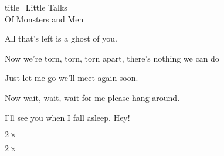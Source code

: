 \begin{song}{title=\predtitle\centering Little Talks \\\large Of Monsters and Men  \vspace*{-0.3cm}}
\begin{centerjustified}
    All that's left is a ghost of you.

 \begin{minipage}{0.87\textwidth}
    Now we're torn, torn, torn apart, there's nothing we can do

    Just let me go we'll meet again soon.

    Now wait, wait, wait for me please hang around.

    I'll see you when I fall asleep. Hey!
\end{minipage}
\begin{minipage}{0.08\textwidth}
\vspace*{0.4cm}
 $2 \times $

 $2 \times $
\end{minipage}




\end{centerjustified}
\setcounter{Slokočet}{0}
\end{song}
